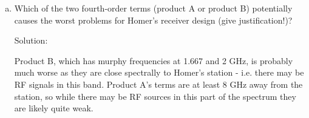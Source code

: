 \begin{homeworkProblem}
\begin{enumerate}[a)]
\begin{callout}{Solution:}
                Since $f_{LO}= f_{RF}^s + f_{0}^{IF} = 5\mathrm{~GHz}$, and we are looking for spurs at the IF center $f_{spur}=f_{IF}$, this implies 
                \begin{align*}
                    f_{RF} &= \frac{|\mathrm{1.0~GHz} \mp 5\mathrm{~GHz}|}{3} 
                    \quad \text{or} \quad
                    |\mathrm{1.0~GHz} \mp 15\mathrm{~GHz}| 
                \end{align*}

                i.e.,
                $$f_{RF} = \{ 1.333, 2, 14, 16 \}\mathrm{~GHz}$$

            \end{callout}

        \item Which of the two fourth-order terms (product A or product B) potentially causes the worst problems for Homer's receiver design (give justification!)?
            \begin{callout}{Solution:}

            Product B, which has murphy frequencies at 1.667 and 2 GHz, is probably much worse as they are close spectrally to Homer's station - i.e. there may be RF signals in this band. Product A's terms are at least 8 GHz away from the station, so while there may be RF sources in this part of the spectrum they are likely quite weak.

            \end{callout}
    \end{enumerate}

\end{homeworkProblem}
